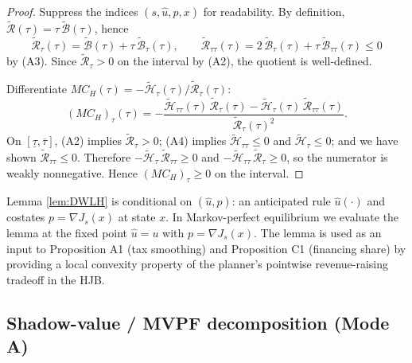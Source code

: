 \documentclass{article}
\begin{document}
\begin{proof}
Suppress the indices $(s,\hat u,p,x)$ for readability. By definition,
$\widetilde{\mathcal R}(\tau)=\tau\,\widetilde{\mathcal B}(\tau)$, hence
\[
\widetilde{\mathcal R}_\tau(\tau)=\widetilde{\mathcal B}(\tau)+\tau\,\widetilde{\mathcal B}_\tau(\tau),
\qquad
\widetilde{\mathcal R}_{\tau\tau}(\tau)=2\,\widetilde{\mathcal B}_\tau(\tau)+\tau\,\widetilde{\mathcal B}_{\tau\tau}(\tau)\le 0
\]
by (A3). Since $\widetilde{\mathcal R}_\tau>0$ on the interval by (A2), the quotient is well-defined.

Differentiate $MC_H(\tau)=-\widetilde{\mathcal H}_\tau(\tau)/\widetilde{\mathcal R}_\tau(\tau)$:
\[
(MC_H)_\tau(\tau)
=
-\frac{\widetilde{\mathcal H}_{\tau\tau}(\tau)\,\widetilde{\mathcal R}_\tau(\tau)
-\widetilde{\mathcal H}_\tau(\tau)\,\widetilde{\mathcal R}_{\tau\tau}(\tau)}
{\widetilde{\mathcal R}_\tau(\tau)^2}.
\]
On $[\underline\tau,\overline\tau]$, (A2) implies $\widetilde{\mathcal R}_\tau>0$; (A4) implies $\widetilde{\mathcal H}_{\tau\tau}\le 0$ and
$\widetilde{\mathcal H}_\tau\le 0$; and we have shown $\widetilde{\mathcal R}_{\tau\tau}\le 0$. Therefore
$-\widetilde{\mathcal H}_\tau\,\widetilde{\mathcal R}_{\tau\tau}\ge 0$ and $-\widetilde{\mathcal H}_{\tau\tau}\,\widetilde{\mathcal R}_\tau\ge 0$,
so the numerator is weakly nonnegative. Hence $(MC_H)_\tau\ge 0$ on the interval.
\end{proof}

\begin{remark}
Lemma \ref{lem:DWLH} is conditional on $(\hat u,p)$: an anticipated rule $\hat u(\cdot)$ and costates $p=\nabla J_s(x)$ at state $x$.
In Markov-perfect equilibrium we evaluate the lemma at the fixed point $\hat u=u$ with $p=\nabla J_s(x)$.
The lemma is used as an input to Proposition A1 (tax smoothing) and Proposition C1 (financing share) by providing a local
convexity property of the planner's pointwise revenue-raising tradeoff in the HJB.
\end{remark}


\subsection{Shadow-value / MVPF decomposition (Mode A)}
\end{document}
